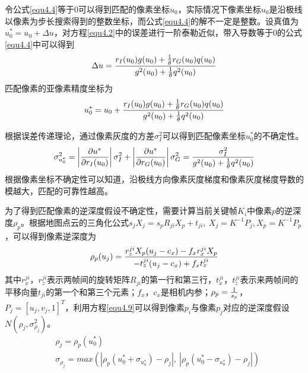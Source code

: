 令公式\ref{equ4.4}等于$0$可以得到匹配的像素坐标$u_0$，实际情况下像素坐标$u_0$是沿极线以像素为步长搜索得到的整数坐标，而公式\ref{equ4.4}的解不一定是整数。设真值为$u_0^*=u_0+\Delta u$，对方程\ref{equ4.2}中的误差进行一阶泰勒近似，带入导数等于$0$的公式\ref{equ4.4}中可以得到
\begin{equation}
\label{equ4.6}
\Delta u = {{ r_I(u_0) g(u_0)+ {1 \over \theta} r_G(u_0)q(u_0) } \over {g^2(u_0)+ { 1 \over \theta} q^2(u_0)}}
\end{equation}
匹配像素的亚像素精度坐标为
\begin{equation}
\label{equ4.7}
u_0^* = u_0 + {{ r_I(u_0) g(u_0)+ {1 \over \theta} r_G(u_0)q(u_0) } \over {g^2(u_0)+ { 1 \over \theta} q^2(u_0)}}
\end{equation}

根据误差传递理论，通过像素灰度的方差$\sigma_I^2$可以得到匹配像素坐标$u_0^*$的不确定性。
\begin{equation}
\label{equ4.8}
\sigma_{u_0^*}^2 = \left \vert { \partial u^* \over \partial r_I(u_0) }  \right \vert \sigma_I^2 + \left \vert { \partial u^* \over \partial r_G(u_0) }  \right \vert \sigma_G^2 = { \sigma_I^2 \over g^2(u_0) + {1 \over \theta} q^2(u_0) }
\end{equation}
根据像素坐标不确定性可以知道，沿极线方向像素灰度梯度和像素灰度梯度导数的模越大，匹配的可靠性越高。

为了得到匹配像素的逆深度假设不确定性，需要计算当前关键帧$K_i$中像素$p$的逆深度$\rho_p$。根据地图点云的三角化公式$s_jX_j = s_pR_{ji}X_p+t_{ji}, \  X_j = K^{-1}P_j, X_p = K^{-1}P_p$，可以得到像素逆深度为
\begin{equation}
\label{equ4.9}
\rho_p(u_j) = { r_z^{ji} X_p (u_j-c_x) - f_x r_x^{ji} X_p  \over - t_z^{ji}(u_j-c_x)+f_x t_x^{ji} }
\end{equation}
其中$r_x^{ji}$，$r_z^{ji}$表示两帧间的旋转矩阵$R_{ji}$的第一行和第三行，$t_x^{ji}$，$t_z^{ji}$表示来两帧间的平移向量$t_{ji}$的第一个和第三个元素；$f_x$，$c_x$是相机内参；$\rho_p = { 1 \over s_p}$，$P_j= \left [ u_j, v_j, 1 \right ] ^T$，利用方程\ref{equ4.9}可以得到像素$p_i$与像素$p_j$对应的逆深度假设$N(\rho_j, \sigma_{\rho_j}^2)$。
\begin{equation}
\label{equ4.10}
\begin{aligned}
& \rho_j = \rho_p(u_0^*) \\ 
& \sigma_{\rho_j} = max \left( \left \vert  \rho_p(u_0^*+\sigma_{u_0^*})-\rho_j \right \vert , \  \left \vert  \rho_p(u_0^*-\sigma_{u_0^*})-\rho_j \right \vert \right)
\end{aligned}
\end{equation}

